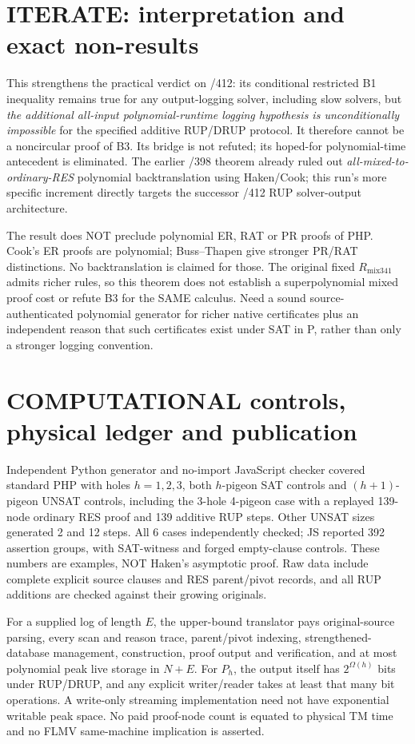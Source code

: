 \documentclass[11pt]{article}
\begin{document}
\section*{ITERATE: interpretation and exact non-results}
This strengthens the practical verdict on /412: its conditional restricted B1 inequality remains true for any output-logging solver, including slow solvers, but \emph{the additional all-input polynomial-runtime logging hypothesis is unconditionally impossible} for the specified additive RUP/DRUP protocol. It therefore cannot be a noncircular proof of B3. Its bridge is not refuted; its hoped-for polynomial-time antecedent is eliminated. The earlier /398 theorem already ruled out \emph{all-mixed-to-ordinary-RES} polynomial backtranslation using Haken/Cook; this run's more specific increment directly targets the successor /412 RUP solver-output architecture.

The result does NOT preclude polynomial ER, RAT or PR proofs of PHP. Cook's ER proofs are polynomial; Buss--Thapen give stronger PR/RAT distinctions. No backtranslation is claimed for those. The original fixed $R_{\mathrm{mix341}}$ admits richer rules, so this theorem does not establish a superpolynomial mixed proof cost or refute B3 for the SAME calculus. Need a sound source-authenticated polynomial generator for richer native certificates plus an independent reason that such certificates exist under SAT in P, rather than only a stronger logging convention.

\section*{COMPUTATIONAL controls, physical ledger and publication}
Independent Python generator and no-import JavaScript checker covered standard PHP with holes $h=1,2,3$, both $h$-pigeon SAT controls and $(h+1)$-pigeon UNSAT controls, including the 3-hole 4-pigeon case with a replayed 139-node ordinary RES proof and 139 additive RUP steps. Other UNSAT sizes generated 2 and 12 steps. All 6 cases independently checked; JS reported 392 assertion groups, with SAT-witness and forged empty-clause controls. These numbers are examples, NOT Haken's asymptotic proof. Raw data include complete explicit source clauses and RES parent/pivot records, and all RUP additions are checked against their growing originals.

For a supplied log of length $E$, the upper-bound translator pays original-source parsing, every scan and reason trace, parent/pivot indexing, strengthened-database management, construction, proof output and verification, and at most polynomial peak live storage in $N+E$. For $P_h$, the output itself has $2^{\Omega(h)}$ bits under RUP/DRUP, and any explicit writer/reader takes at least that many bit operations. A write-only streaming implementation need not have exponential writable peak space. No paid proof-node count is equated to physical TM time and no FLMV same-machine implication is asserted.
\end{document}
